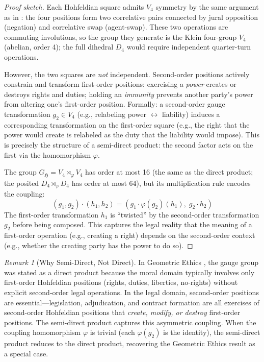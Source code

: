 \documentclass[12pt]{article}
\theoremstyle{definition}
\theoremstyle{remark}
\newtheorem{remark}[theorem]{Remark}
\newcommand{\Ho}{\mathfrak{H}}             %
\begin{document}
\begin{proof}[Proof sketch]
Each Hohfeldian square admits $V_4$ symmetry by the same argument as in \cite{anon2026a}: the four positions form two correlative pairs connected by jural opposition (negation) and correlative swap (agent-swap).  These two operations are commuting involutions, so the group they generate is the Klein four-group $V_4$ (abelian, order 4); the full dihedral $D_4$ would require independent quarter-turn operations.

However, the two squares are \emph{not} independent.  Second-order positions actively constrain and transform first-order positions: exercising a \emph{power} creates or destroys rights and duties; holding an \emph{immunity} prevents another party's power from altering one's first-order position.  Formally: a second-order gauge transformation $g_2 \in V_4$ (e.g., relabeling power $\leftrightarrow$ liability) induces a corresponding transformation on the first-order square (e.g., the right that the power would create is relabeled as the duty that the liability would impose).  This is precisely the structure of a semi-direct product: the second factor acts on the first via the homomorphism $\varphi$.

The group $G_{\Ho} = V_4 \rtimes_\varphi V_4$ has order at most 16 (the same as the direct product; the posited $D_4 \rtimes_\varphi D_4$ has order at most 64), but its multiplication rule encodes the coupling:
\begin{equation}
(g_1, g_2) \cdot (h_1, h_2) = (g_1 \cdot \varphi(g_2)(h_1),\; g_2 \cdot h_2)
\label{eq:semidirect_mult}
\end{equation}
The first-order transformation $h_1$ is ``twisted'' by the second-order transformation $g_2$ before being composed.  This captures the legal reality that the meaning of a first-order operation (e.g., creating a right) depends on the second-order context (e.g., whether the creating party has the power to do so).
\end{proof}

\begin{remark}[Why Semi-Direct, Not Direct]
In Geometric Ethics \cite{anon2026a}, the gauge group was stated as a direct product because the moral domain typically involves only first-order Hohfeldian positions (rights, duties, liberties, no-rights) without explicit second-order legal operations.  In the legal domain, second-order positions are essential---legislation, adjudication, and contract formation are all exercises of second-order Hohfeldian positions that \emph{create, modify, or destroy} first-order positions.  The semi-direct product captures this asymmetric coupling.  When the coupling homomorphism $\varphi$ is trivial (each $\varphi(g_2)$ is the identity), the semi-direct product reduces to the direct product, recovering the Geometric Ethics result as a special case.
\end{remark}
\end{document}
